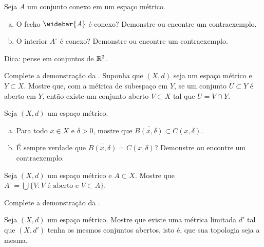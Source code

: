 \begin{exercise}
\pagebreak[2]
Seja $A$ um conjunto conexo em um espaço métrico.
\begin{enumerate}[a)]
\item
O fecho $\widebar{A}$ é conexo? Demonstre ou encontre um contraexemplo.
\item
O interior $A^\circ$ é conexo? Demonstre ou encontre um contraexemplo.
\end{enumerate}
Dica: pense em conjuntos de ${\mathbb{R}}^2$.
\end{exercise}

\begin{exercise} \label{exercise:mssubspace}
Complete a demonstração da .
Suponha que $(X,d)$ seja um espaço métrico e $Y \subset X$. Mostre que,
com a métrica de subespaço em $Y$, se um conjunto $U \subset Y$
é aberto em $Y$, então existe um conjunto aberto $V \subset X$ tal que
$U = V \cap Y$.
\end{exercise}

\begin{samepage}
\begin{exercise}
Seja $(X,d)$ um espaço métrico.
\begin{enumerate}[a)]
\item
Para todo $x \in X$ e $\delta > 0$, mostre que
$\overline{B(x,\delta)} \subset C(x,\delta)$.
\item
É sempre verdade que
$\overline{B(x,\delta)} = C(x,\delta)$? Demonstre ou encontre um
contraexemplo.
\end{enumerate}
\end{exercise}
\end{samepage}

\begin{exercise} \label{exercise:interiortopologic}
Seja $(X,d)$ um espaço métrico e $A \subset X$. Mostre que
$A^\circ = \bigcup \{ V : V \text{ é aberto e } V \subset A \}$.
\end{exercise}

\begin{exercise}
Complete a demonstração da .
\end{exercise}

\begin{exercise}
Seja $(X,d)$ um espaço métrico. Mostre que existe uma métrica limitada
$d'$ tal que $(X,d')$ tenha os mesmos conjuntos abertos, isto é, que sua
topologia seja a mesma.
\end{exercise}


